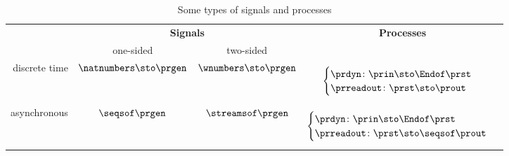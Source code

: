 




\section{}
%

\begin{table*}[p]
\caption{Some types of signals and processes}
\begin{tabular}{rccc}
& \multicolumn{2}{c}{\textbf{Signals}} & \textbf{Processes} \\
&\rule{0pt}{10pt} one-sided & two-sided &   \\
discrete time &
$\natnumbers \sto \prgen$
&
$\wnumbers \sto \prgen$
&
\begin{minipage}{4cm}\raggedright
\begin{equation*}\label{eq:a}
    \begin{cases}
    \prdyn \colon \prin \sto \Endof \prst \\
    \prreadout \colon \prst \sto \prout
    \end{cases}
\end{equation*}
\end{minipage}
\\

asynchronous& $\seqsof \prgen$ &  $\streamsof \prgen$ &
\begin{minipage}{4cm}\raggedright
\begin{equation*}
\begin{cases}
\prdyn \colon \prin \sto \Endof \prst \\
\prreadout \colon \prst \sto \seqsof \prout
\end{cases}
\end{equation*}


\end{minipage}
\end{tabular}
\end{table*}
